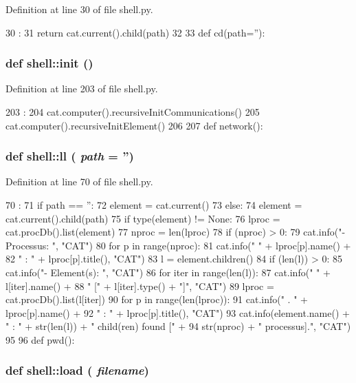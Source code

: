 Definition at line 30 of file shell.py.


\begin{DoxyCode}
30              :
31   return cat.current().child(path)
32 
33 
def cd(path=''):
\end{DoxyCode}
\hypertarget{namespaceshell_aea65e514317f5f71eb92b6c1434dd3c3}{
\subsubsection[{init}]{\setlength{\rightskip}{0pt plus 5cm}def shell::init ()}}
\label{namespaceshell_aea65e514317f5f71eb92b6c1434dd3c3}


Definition at line 203 of file shell.py.


\begin{DoxyCode}
203           :
204   cat.computer().recursiveInitCommunications()
205   cat.computer().recursiveInitElement()
206 
207 
def network():
\end{DoxyCode}
\hypertarget{namespaceshell_a6d2e8102d1709f7f0f171bca182dcae8}{
\subsubsection[{ll}]{\setlength{\rightskip}{0pt plus 5cm}def shell::ll ( {\em path} = {\ttfamily ''})}}
\label{namespaceshell_a6d2e8102d1709f7f0f171bca182dcae8}


Definition at line 70 of file shell.py.


\begin{DoxyCode}
70                :
71   if path == '':
72     element = cat.current()
73   else:
74     element = cat.current().child(path)
75   if type(element) != None:
76     lproc = cat.procDb().list(element)
77     nproc = len(lproc)
78     if (nproc) > 0:
79       cat.info("- Processus: ", "CAT")
80     for p in range(nproc):
81       cat.info("    " + lproc[p].name() +
82                " : " + lproc[p].title(), "CAT")
83     l = element.children()
84     if (len(l)) > 0:
85       cat.info("- Element(s): ", "CAT")
86     for iter in range(len(l)):
87       cat.info("    " + l[iter].name() +
88                " [" + l[iter].type() + "]", "CAT")
89       lproc = cat.procDb().list(l[iter])
90       for p in range(len(lproc)):
91         cat.info("       . " + lproc[p].name() +
92                  " : " + lproc[p].title(), "CAT")
93       cat.info(element.name() + " :  " + str(len(l)) + " child(ren) found [" +
94                str(nproc) + " processus].", "CAT")
95 
96 
def pwd():
\end{DoxyCode}
\hypertarget{namespaceshell_adb0ae939e9986342e61b1bb10770cb20}{
\subsubsection[{load}]{\setlength{\rightskip}{0pt plus 5cm}def shell::load ( {\em filename})}}
\label{namespaceshell_adb0ae939e9986342e61b1bb10770cb20}


